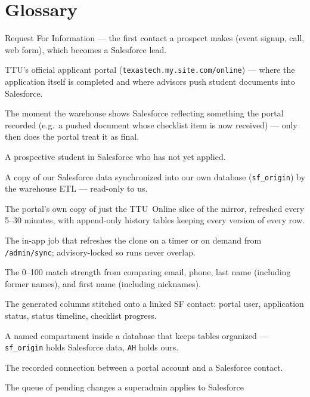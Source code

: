 \documentclass[11pt,letterpaper]{report}
\begin{document}
\chapter*{Glossary}

\begin{description}[leftmargin=1.4em,style=nextline]
  \item[RFI] Request For Information --- the first contact a prospect makes
  (event signup, call, web form), which becomes a Salesforce lead.
  \item[RaiderConnect] TTU's official applicant portal
  (\texttt{texastech.my.site.com/online}) --- where the application itself is
  completed and where advisors push student documents into Salesforce.
  \item[Parity] The moment the warehouse shows Salesforce reflecting something
  the portal recorded (e.g.\ a pushed document whose checklist item is now
  received) --- only then does the portal treat it as final.
  \item[Lead] A prospective student in Salesforce who has not yet applied.
  \item[Salesforce mirror] A copy of our Salesforce data synchronized into our
  own database (\texttt{sf\_origin}) by the warehouse ETL --- read-only to us.
  \item[Clone (\texttt{AH.sf\_*})] The portal's own copy of just the
  TTU~Online slice of the mirror, refreshed every 5--30 minutes, with
  append-only history tables keeping every version of every row.
  \item[Sync engine] The in-app job that refreshes the clone on a timer or on
  demand from \texttt{/admin/sync}; advisory-locked so runs never overlap.
  \item[Confidence score] The 0--100 match strength from comparing email,
  phone, last name (including former names), and first name (including
  nicknames).
  \item[Projection] The generated columns stitched onto a linked SF contact:
  portal user, application status, status timeline, checklist progress.
  \item[Schema] A named compartment inside a database that keeps tables
  organized --- \texttt{sf\_origin} holds Salesforce data, \texttt{AH} holds
  ours.
  \item[Identity link] The recorded connection between a portal account and a
  Salesforce contact.
  \item[Outbox] The queue of pending changes a superadmin applies to Salesforce

\end{description}
\end{document}
